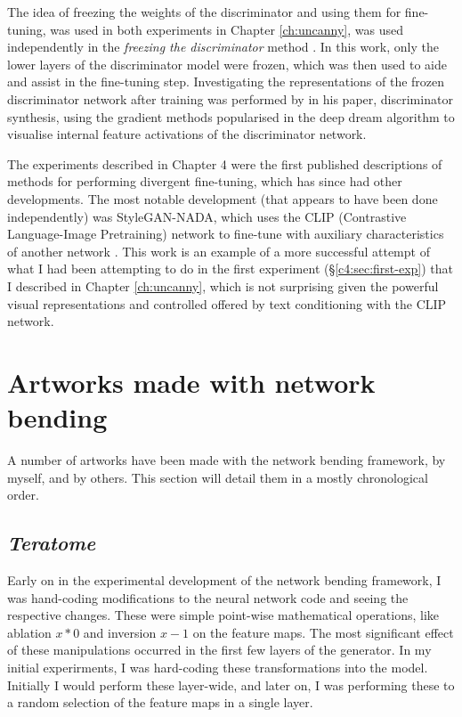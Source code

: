 The idea of freezing the weights of the discriminator and using them for fine-tuning, was used in both experiments in Chapter \ref{ch:uncanny}, was used independently in the \textit{freezing the discriminator} method \citep{mo2020freeze}. In this work, only the lower layers of the discriminator model were frozen, which was then used to aide and assist in the fine-tuning step.
Investigating the representations of the frozen discriminator network after training was performed by \citet{porres2021discriminator} in his paper, discriminator synthesis, using the gradient methods popularised in the deep dream algorithm to visualise internal feature activations of the discriminator network.

The experiments described in Chapter 4 were the first published descriptions of methods for performing divergent fine-tuning, which has since had other developments. 
The most notable development (that appears to have been done independently) was StyleGAN-NADA, which uses the CLIP (Contrastive Language-Image Pretraining) \cite{radford2021learning} network to fine-tune with auxiliary characteristics of another network \citep{gal2022stylegan}. 
This work is an example of a more successful attempt of what I had been attempting to do in the first experiment (\S \ref{c4:sec:first-exp}) that I described in Chapter \ref{ch:uncanny}, which is not surprising given the powerful visual representations and controlled offered by text conditioning with the CLIP network.


\section{Artworks made with network bending}
\label{c7:sec:net-bend-artworks}

A number of artworks have been made with the network bending framework, by myself, and by others. 
This section will detail them in a mostly chronological order.

\subsection{\textit{Teratome}}
\label{c7:subsubsec:teratome}

Early on in the experimental development of the network bending framework, I was hand-coding modifications to the neural network code and seeing the respective changes. 
These were simple point-wise mathematical operations, like ablation $x*0$ and inversion $x-1$ on the feature maps. 
The most significant effect of these manipulations occurred in the first few layers of the generator. 
In my initial experirments, I was hard-coding these transformations into the model. Initially I would perform these layer-wide, and later on, I was performing these to a random selection of the feature maps in a single layer. 


